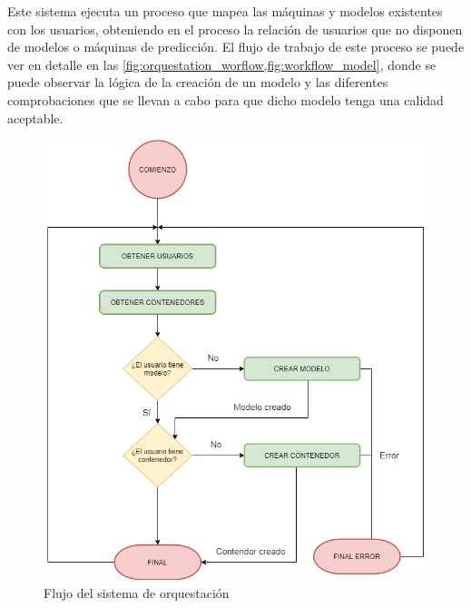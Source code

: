 Este sistema ejecuta un proceso que mapea las máquinas y modelos existentes con los usuarios, obteniendo en el proceso la relación de usuarios que no disponen de modelos o máquinas de predicción. El flujo de trabajo de este proceso se puede ver en detalle en las \cref{fig:orquestation_worflow,fig:workflow_model}, donde se puede observar la lógica de la creación de un modelo y las diferentes comprobaciones que se llevan a cabo para que dicho modelo tenga una calidad aceptable.


\begin{figure}[htbp!]
    \centering
    \begin{minipage}{.49\textwidth}
        \centering
        \includegraphics[width=\linewidth,keepaspectratio]{images/orquestation/workflow.png}
        \caption{Flujo del sistema de orquestación}
        \label{fig:orquestation_worflow}
    \end{minipage}
    \begin{minipage}{.49\textwidth}
        \centering

\end{minipage}
\end{figure}
